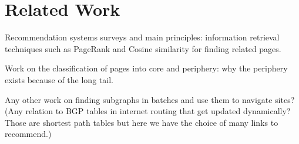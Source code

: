 \section{Related Work}

Recommendation systems surveys and main principles: information retrieval techniques such as PageRank and Cosine similarity for finding related pages.


Work on the classification of pages into core and periphery: why the periphery exists because of the long tail.

Any other work on finding subgraphs in batches and use them to navigate sites? (Any relation to BGP tables in internet routing that get updated dynamically? Those are shortest path tables but here we have the choice of many links to recommend.)
